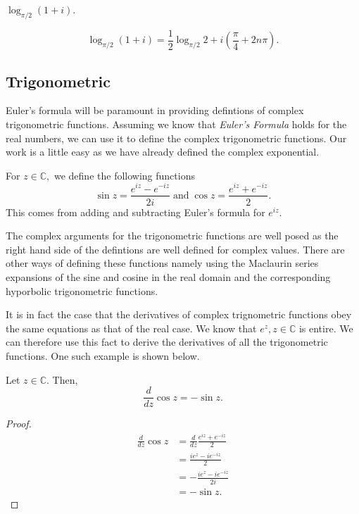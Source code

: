 \documentclass[12pt]{book}
\begin{document}
\begin{exmp}
    $\log_{\pi/2}(1 + i).$
\end{exmp}
\[
    \log_{\pi/2}(1 + i) = \frac{1}{2}\log_{\pi / 2} 2  + i\left(\frac{\pi}{4} + 2n\pi\right).
\]

\subsection{Trigonometric}
Euler's formula will be paramount in providing defintions of complex trigonometric functions. Assuming we know that \textit{Euler's Formula} holds for the real numbers, we can use it to define the complex trigonometric functions. Our work is a little easy as we have already defined the complex exponential.
\begin{defn}
    For $z \in \mathbb{C}, $ we define the following functions
    \[
        \sin z = \frac{e^{iz} - e^{-iz}}{2i}
        \;\text{and}\;
        \cos z = \frac{e^{iz} + e^{-iz}}{2}.
    \]
    This comes from adding and subtracting Euler's formula for $e^{iz}.$
\end{defn}
The complex arguments for the trigonometric functions are well posed as the right hand side of the defintions are well defined for complex values. There are other ways of defining these functions namely using the Maclaurin series expansions of the sine and cosine in the real domain and the corresponding hyporbolic trigonometric functions.

It is in fact the case that the derivatives of complex trignometric functions obey the same equations as that of the real case. We know that $e^{z}, z \in \mathbb{C}$ is entire. We can therefore use this fact to derive the derivatives of all the trigonometric functions. One such example is shown below.

\begin{thm}
    Let $z \in \mathbb{C}.$ Then,
    \[
        \frac{d}{dz} \cos z = -\sin z.
    \]
\end{thm}
\begin{proof}
    \begin{align*}
        \frac{d}{dz} \cos z
            &=
                \frac{d}{dz} \frac{e^{iz} + e^{-iz}}{2} \\
            &=
                \frac{ie^{z} - ie^{-iz}}{2} \\
            &=
                - \frac{ie^{z} - ie^{-iz}}{2i} \\
            &=
                - \sin z.
    \end{align*}
\end{proof}
\end{document}
